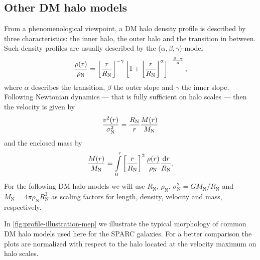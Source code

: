 \subsection{Other DM halo models}
\label{sec:model:dc14-nfw}

From a phenomenological viewpoint, a DM halo density profile is described by three characteristics: the inner halo, the outer halo and the transition in between. Such density profiles are usually described by the ($\alpha, \beta, \gamma$)-model \citep{1990ApJ...356..359H} 
%
\begin{equation}
    \label{eqn:hernquist}
	\frac{\rho(r)}{\rho_\mathrm{N}} = \qbracket{\frac{r}{R_\mathrm{N}}}^{-\gamma}\qbracket{1 + \qbracket{\frac{r}{R_\mathrm{N}}}^\alpha}^{-\frac{\beta - \gamma}{\alpha}},
\end{equation} 
%
where $\alpha$ describes the transition, $\beta$ the outer slope and $\gamma$ the inner slope. Following Newtonian dynamics --- that is fully sufficient on halo scales --- then the velocity is given by \begin{equation}
    \label{eqn:circular-velocity}
    \frac{v^2(r)}{\sigma_\mathrm{N}^2} = \frac{R_{\rm N}}{r}\frac{M(r)}{M_{\rm N}}
\end{equation} and the enclosed mass by \begin{equation}
    \label{eqn:enclosed-mass}
     \frac{M(r)}{M_{\rm N}} = \int \limits_0^r \qbracket{\frac{r}{R_{\rm N}}}^2 \frac{\rho(r)}{\rho_\mathrm{N}} \frac{\d r}{R_{\rm N}},
\end{equation} For the following DM halo models we will use $R_\mathrm{N}$, $\rho_\mathrm{N}$, $\sigma_\mathrm{N}^2 = G M_\mathrm{N}/R_\mathrm{N}$ and $M_\mathrm{N} = 4\pi \rho_\mathrm{N} R_\mathrm{N}^3$ as scaling factors for length, density, velocity and mass, respectively.

In \cref{fig:profile-illustration-mep} we illustrate the typical morphology of common DM halo models used here for the SPARC galaxies. For a better comparison the plots are normalized with respect to the halo located at the velocity maximum on halo scales.

